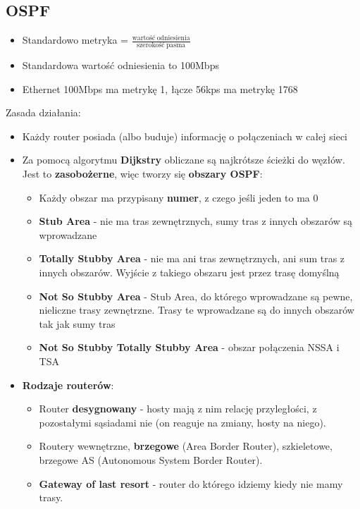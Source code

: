 \documentclass[main.tex]{subfiles}
\begin{document}
    \subsection{OSPF}
    \begin{itemize}[noitemsep]
        \item Standardowo metryka = $\frac{\mathrm{wartość\ odniesienia}}{\mathrm{szerokość\ pasma}}$
        \item Standardowa wartość odniesienia to 100Mbps
        \item Ethernet 100Mbps ma metrykę 1, łącze 56kps ma metrykę 1768
    \end{itemize}

    \noindent Zasada działania:
    \begin{itemize}[noitemsep]
        \item Każdy router posiada (albo buduje) informację o połączeniach w całej sieci

        \item Za pomocą algorytmu \textbf{Dijkstry} obliczane są najkrótsze ścieżki do węzłów. Jest to
        \textbf{zasobożerne}, więc tworzy się \textbf{obszary OSPF}:
        \begin{itemize}[noitemsep]
            \item Każdy obszar ma przypisany \textbf{numer}, z czego jeśli jeden to ma 0
            \item \textbf{Stub Area} - nie ma tras zewnętrznych, sumy tras z innych obszarów są wprowadzane
            \item \textbf{Totally Stubby Area} - nie ma ani tras zewnętrznych, ani sum tras z innych obszarów.
            Wyjście z takiego obszaru jest przez trasę domyślną
            \item \textbf{Not So Stubby Area} - Stub Area, do którego wprowadzane są pewne, nieliczne trasy
            zewnętrzne. Trasy te wprowadzane są do innych obszarów tak jak sumy tras
            \item \textbf{Not So Stubby Totally Stubby Area} - obszar połączenia NSSA i TSA
        \end{itemize}

        \item \textbf{Rodzaje routerów}:
        \begin{itemize}
            \item Router \textbf{desygnowany} - hosty mają z nim relację przyległości, z pozostałymi sąsiadami nie (on
            reaguje na zmiany, hosty na niego).
            \item Routery wewnętrzne, \textbf{brzegowe} (Area Border Router), szkieletowe, brzegowe AS (Autonomous System
            Border Router).
            \item \textbf{Gateway of last resort} - router do którego idziemy kiedy nie mamy trasy.
        \end{itemize}


\end{itemize}
\end{document}
